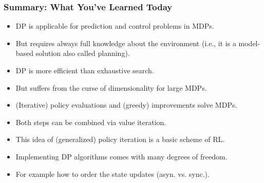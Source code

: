 \begin{frame}
\frametitle{Summary: What You've Learned Today}
\begin{itemize}
	\item DP is applicable for prediction and control problems in MDPs.\pause
	\item But requires always full knowledge about the environment (i.e., it is a model-based solution also called planning).\pause
	\item DP is more efficient than exhaustive search.\pause
	\item But suffers from the curse of dimensionality for large MDPs.\pause
	\item (Iterative) policy evaluations and (greedy) improvements solve MDPs.\pause
	\item Both steps can be combined via value iteration.\pause
	\item This idea of (generalized) policy iteration is a basic scheme of RL.\pause
	\item Implementing DP algorithms comes with many degrees of freedom.
	\item For example how to order the state updates (asyn. vs. sync.).
\end{itemize}
\end{frame}

